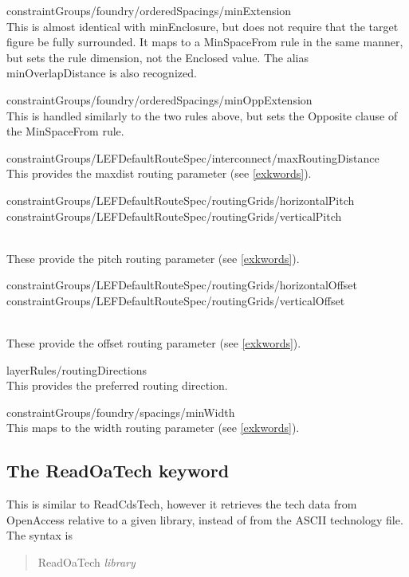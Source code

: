 \begin{description}
\item{\vt constraintGroups/foundry/orderedSpacings/minExtension}\\
This is almost identical with {\vt minEnclosure}, but does not require
that the target figure be fully surrounded.  It maps to a {\vt
MinSpaceFrom} rule in the same manner, but sets the rule dimension,
not the {\vt Enclosed} value.  The alias {\vt minOverlapDistance} is
also recognized.

\item{\vt constraintGroups/foundry/orderedSpacings/minOppExtension}\\
This is handled similarly to the two rules above, but sets the {\vt
Opposite} clause of the {\vt MinSpaceFrom} rule.

\item{\vt constraintGroups/LEFDefaultRouteSpec/interconnect/maxRoutingDistance}\\
This provides the {\et maxdist} routing parameter (see \ref{exkwords}).

\item{\parbox{4in}{\vt constraintGroups/LEFDefaultRouteSpec/routingGrids/horizontalPitch\newline
constraintGroups/LEFDefaultRouteSpec/routingGrids/verticalPitch}}\\
These provide the {\et pitch} routing parameter (see \ref{exkwords}).

\item{\parbox{4in}{\vt constraintGroups/LEFDefaultRouteSpec/routingGrids/horizontalOffset\newline
constraintGroups/LEFDefaultRouteSpec/routingGrids/verticalOffset}}\\
These provide the {\vt offset} routing parameter (see \ref{exkwords}).

\item{\vt layerRules/routingDirections}\\
This provides the preferred routing direction.

\item{\vt constraintGroups/foundry/spacings/minWidth}\\
This maps to the {\et width} routing parameter (see \ref{exkwords}).
\end{description}


\ifoa
\subsection{The {\vt ReadOaTech} keyword}
This is similar to {\vt ReadCdsTech}, however it retrieves the tech
data from OpenAccess relative to a given library, instead of from the
ASCII technology file.  The syntax is
\begin{quote}
{\vt ReadOaTech} {\it library}
\end{quote}
 

